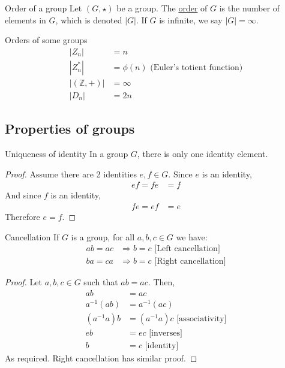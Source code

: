 \documentclass[12pt]{article}
\newcommand{\Z}{\mathbb{Z}}
\newcommand{\inv}{^{-1}}
\begin{document}
	\begin{mydef}{Order of a group}{}
		Let $(G, \star)$ be a group. The \underline{order} of $G$ is the number of elements in $G$, which is denoted $|G|$. If $G$ is infinite, we say $|G|=\infty$.	
	\end{mydef}
	
	\begin{myex}{Orders of some groups}{}
		\begin{align*}
			|Z_n|&=n\\
			|Z_n^*|&=\phi(n)\text{ (Euler's totient function)}\\
			|(\Z, +)|&=\infty\\
			|D_n|&=2n
		\end{align*}			
	\end{myex}
	
	\subsection{Properties of groups}
	\begin{myprop}{Uniqueness of identity}{}
		In a group $G$, there is only one identity element.
		\begin{proof}
			Assume there are 2 identities $e, f\in G$. Since $e$ is an identity,
			\begin{align*}
				ef=fe&=f
			\end{align*}
			And since $f$ is an identity,
			\begin{align*}
				fe=ef&=e
			\end{align*}
			Therefore $e=f$.
		\end{proof}			
	\end{myprop}
	
	\begin{myprop}{Cancellation}{}
		If $G$ is a group, for all $a, b, c\in G$ we have:
		\begin{align*}
			ab=ac&\Longrightarrow b=c\text{ [Left cancellation]}\\
			ba=ca&\Longrightarrow b=c\text{ [Right cancellation]}
		\end{align*}
		\begin{proof}
			Let $a, b, c\in G$ such that $ab=ac$. Then,
			\begin{align*}
				ab&=ac\\
				a\inv(ab)&=a\inv(ac)\\
				(a\inv a)b&=(a\inv a)c\text{ [associativity]}\\
				eb&=ec\text{ [inverses]}\\
				b&=c\text{ [identity]}
			\end{align*}
			As required. Right cancellation has similar proof.
		\end{proof}
	\end{myprop}
	
\end{document}
